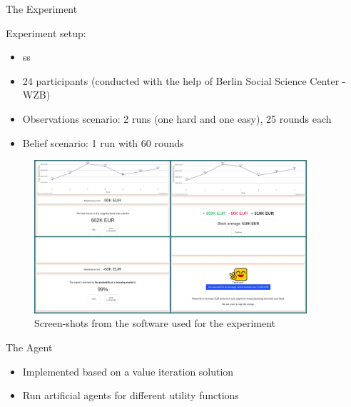 

\begin{block}{The Experiment}

Experiment setup: 

\begin{itemize}
    \item ss 
    \item 24 participants (conducted with the help of Berlin Social Science Center - WZB)
    \item Observations scenario: 2 runs (one hard and one easy), 25 rounds each
    \item Belief scenario: 1 run with 60 rounds
\end{itemize}

\begin{figure}
  \centering
    \includegraphics[width=0.9\textwidth]{img/methods/pjimage.jpg}
  \caption{Screen-shots from the software used for the experiment}
  
\end{figure}

\end{block}


\begin{block}{The Agent}

\begin{itemize}
    \item Implemented based on a value iteration solution
    \item Run artificial agents for different utility functions
\end{itemize}

\end{block}

